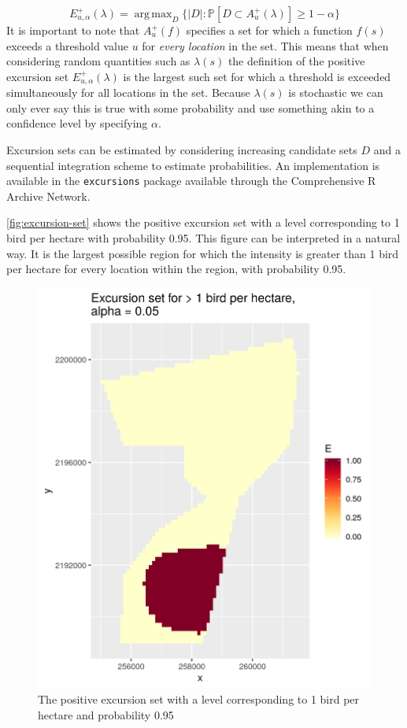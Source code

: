 \documentclass[preprint,12pt]{elsarticle}
\DeclareMathOperator*{\argmax}{arg\,max}  %
\begin{document}
\begin{equation*}
E_{u,\alpha}^{+}(\lambda) = \argmax_{D}\{\lvert D \rvert : \mathbb{P}\left[D \subset A_u^{+}(\lambda)\right] \geq 1 - \alpha \}
\end{equation*}
It is important to note that $A_u^{+}(f)$ specifies a set for which a function $f(s)$ exceeds a threshold value $u$ for \textit{every location} in the set.  This means that when considering random quantities such as $\lambda(s)$ the definition of the positive excursion set $E_{u,\alpha}^{+}(\lambda)$ is the largest such set for which a threshold is exceeded simultaneously for all locations in the set.  Because $\lambda(s)$ is stochastic we can only ever say this is true with some probability and use something akin to a confidence level by specifying $\alpha$.

Excursion sets can be estimated by considering increasing candidate sets $D$ and a sequential integration scheme to estimate probabilities.  An implementation is available in the \texttt{excursions} package available through the Comprehensive R Archive Network.

\autoref{fig:excursion-set} shows the positive excursion set with a level corresponding to 1 bird per hectare with probability 0.95.  This figure can be interpreted in a natural way.  It is the largest possible region for which the intensity is greater than 1 bird per hectare for every location within the region, with probability 0.95.

\begin{figure}
	\includegraphics[scale=0.5]{figures/excursion_set.png}
	\caption{The positive excursion set with a level corresponding to 1 bird per hectare and probability 0.95}
	\label{fig:excursion-set}
\end{figure}
\end{document}
